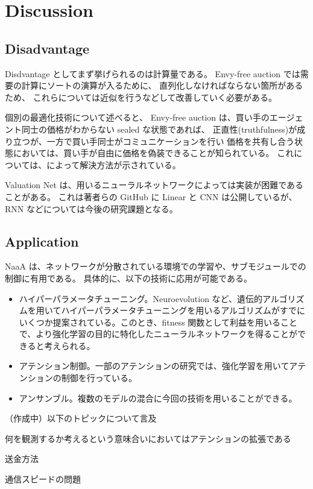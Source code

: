 \section{Discussion}
\subsection{Disadvantage}
Disdvantage としてまず挙げられるのは計算量である。
Envy-free auction では需要の計算にソートの演算が入るために、
直列化しなければならない箇所があるため、
これらについては近似を行うなどして改善していく必要がある。

個別の最適化技術について述べると、
Envy-free auction は、買い手のエージェント同士の価格がわからない sealed な状態であれば、
正直性(truthfulness)が成り立つが、一方で買い手同士がコミュニケーションを行い
価格を共有し合う状態においては、買い手が自由に価格を偽装できることが知られている。
これについては、によって解決方法が示されている。

Valuation Net は、用いるニューラルネットワークによっては実装が困難であることがある。
これは著者らの GitHub に Linear と CNN は公開しているが、
RNN などについては今後の研究課題となる。

\subsection{Application}
NaaA は、ネットワークが分散されている環境での学習や、サブモジュールでの制御に有用である。
具体的に、以下の技術に応用が可能である。

\begin{itemize}
\item ハイパーパラメータチューニング。Neuroevolution など、遺伝的アルゴリズムを用いてハイパーパラメータチューニングを用いるアルゴリズムがすでにいくつか提案されている。このとき、fitness 関数として利益を用いることで、より強化学習の目的に特化したニューラルネットワークを得ることができると考えられる。
\item アテンション制御。一部のアテンションの研究では、強化学習を用いてアテンションの制御を行っている。
\item アンサンブル。複数のモデルの混合に今回の技術を用いることができる。
\end{itemize}


（作成中）以下のトピックについて言及

何を観測するか考えるという意味合いにおいてはアテンションの拡張である

送金方法

通信スピードの問題

